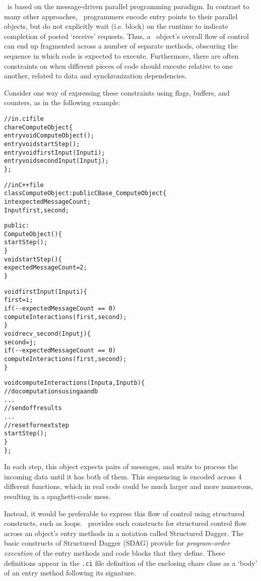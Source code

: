 \charmpp\ is based on the message-driven parallel programming paradigm. In
contrast to many other approaches, \charmpp\ programmers encode entry points to
their parallel objects, but do not explicitly wait (i.e. block) on the runtime
to indicate completion of posted `receive' requests. Thus, a \charmpp\ object's
overall flow of control can end up fragmented across a number of separate
methods, obscuring the sequence in which code is expected to
execute. Furthermore, there are often constraints on when different pieces of
code should execute relative to one another, related to data and
synchronization dependencies.

Consider one way of expressing these constraints using flags, buffers, and
counters, as in the following example:
%
\begin{center}
\begin{alltt}
// in .ci file
chare ComputeObject \{
  entry void ComputeObject();
  entry void startStep();
  entry void firstInput(Input i);
  entry void secondInput(Input j);
\};

// in C++ file
class ComputeObject : public CBase_ComputeObject \{
  int   expectedMessageCount;
  Input first, second;

public:
  ComputeObject() \{
    startStep();
  \}
  void startStep() \{
    expectedMessageCount = 2;
  \}

  void firstInput(Input i) \{
    first = i;
    if (\verb|--expectedMessageCount == 0|)
      computeInteractions(first, second);
    \}
  void recv_second(Input j) \{
    second = j;
    if (\verb|--expectedMessageCount == 0|)
      computeInteractions(first, second);
  \}

  void computeInteractions(Input a, Input b) \{
    // do computations using a and b
    . . .
    // send off results
    . . .
    // reset for next step
    startStep();
  \}
\};
\end{alltt}
\end{center}
In each step, this object expects pairs of messages, and waits to process the
incoming data until it has both of them. This sequencing is encoded across 4
different functions, which in real code could be much larger and more numerous,
resulting in a spaghetti-code mess.

Instead, it would be preferable to express this flow of control using
structured constructs, such as loops. \charmpp\ provides such constructs for
structured control flow across an object's entry methods in a notation called
Structured Dagger. The basic constructs of Structured Dagger (SDAG) provide for
\emph{program-order execution} of the entry methods and code blocks that they
define. These definitions appear in the {\tt .ci} file definition of the
enclosing chare class as a `body' of an entry method following its signature.

